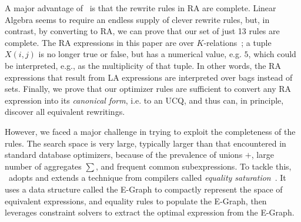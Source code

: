 A major advantage of \sys\ is that the rewrite rules in RA are
complete.  Linear Algebra seems to require an endless supply of clever
rewrite rules, but, in contrast, by converting to RA, we can prove
that our set of just 13 rules are complete. The RA expressions in this paper are
over $K$-relations~\cite{DBLP:conf/pods/GreenKT07}; a tuple $X(i,j)$
is no longer true or false, but has a numerical value, e.g. $5$,
%
which could be interpreted, e.g., as the multiplicity of that tuple.
%
In other words, the RA expressions that result from LA expressions are
interpreted over bags instead of sets. 
Finally, we prove that our optimizer rules are
sufficient to convert any RA expression into its {\em canonical form},
i.e.  to an UCQ, and thus can, in principle, discover all equivalent
rewritings.

However, we faced a major challenge in trying to exploit the
completeness of the rules.  The search space is very large,
typically larger than that encountered in standard database
optimizers, because of the prevalence of unions $+$, large number of
aggregates $\sum$, and frequent common subexpressions. To tackle this,
\sys\ adopts and extends a technique from compilers called {\em
  equality saturation}~\cite{DBLP:journals/corr/abs-1012-1802}.
It uses a data structure called the E-Graph \cite{10.5555/909447} to
compactly represent the space of equivalent expressions, and equality
rules to populate the E-Graph, then leverages constraint solvers to
extract the optimal expression from the E-Graph.  

